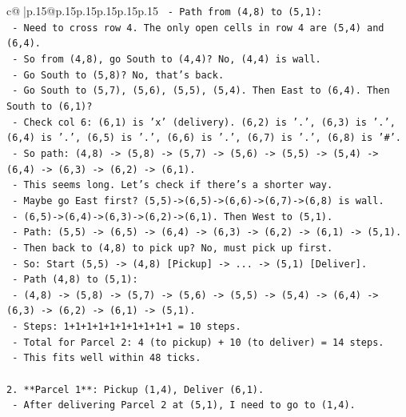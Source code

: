 \documentclass{article}
\begin{document}
{\begin{supertabular}{c@{$\;$}|p{.15\linewidth}@{}p{.15\linewidth}p{.15\linewidth}p{.15\linewidth}p{.15\linewidth}p{.15\linewidth}}
{{{\texttt{    {-} Path from (4,8) to (5,1):} \\
\texttt{        {-} Need to cross row 4. The only open cells in row 4 are (5,4) and (6,4).} \\
\texttt{        {-} So from (4,8), go South to (4,4)? No, (4,4) is wall.} \\
\texttt{        {-} Go South to (5,8)? No, that's back.} \\
\texttt{        {-} Go South to (5,7), (5,6), (5,5), (5,4). Then East to (6,4). Then South to (6,1)?} \\
\texttt{        {-} Check col 6: (6,1) is 'x' (delivery). (6,2) is '.', (6,3) is '.', (6,4) is '.', (6,5) is '.', (6,6) is '.', (6,7) is '.', (6,8) is '\#'.} \\
\texttt{        {-} So path: (4,8) {-}> (5,8) {-}> (5,7) {-}> (5,6) {-}> (5,5) {-}> (5,4) {-}> (6,4) {-}> (6,3) {-}> (6,2) {-}> (6,1).} \\
\texttt{        {-} This seems long. Let's check if there's a shorter way.} \\
\texttt{        {-} Maybe go East first? (5,5){-}>(6,5){-}>(6,6){-}>(6,7){-}>(6,8) is wall.} \\
\texttt{        {-} (6,5){-}>(6,4){-}>(6,3){-}>(6,2){-}>(6,1). Then West to (5,1).} \\
\texttt{        {-} Path: (5,5) {-}> (6,5) {-}> (6,4) {-}> (6,3) {-}> (6,2) {-}> (6,1) {-}> (5,1).} \\
\texttt{        {-} Then back to (4,8) to pick up? No, must pick up first.} \\
\texttt{        {-} So: Start (5,5) {-}> (4,8) {[}Pickup{]} {-}> ... {-}> (5,1) {[}Deliver{]}.} \\
\texttt{        {-} Path (4,8) to (5,1):} \\
\texttt{          {-} (4,8) {-}> (5,8) {-}> (5,7) {-}> (5,6) {-}> (5,5) {-}> (5,4) {-}> (6,4) {-}> (6,3) {-}> (6,2) {-}> (6,1) {-}> (5,1).} \\
\texttt{          {-} Steps: 1+1+1+1+1+1+1+1+1+1 = 10 steps.} \\
\texttt{          {-} Total for Parcel 2: 4 (to pickup) + 10 (to deliver) = 14 steps.} \\
\texttt{          {-} This fits well within 48 ticks.} \\
\\ 
\texttt{2.  **Parcel 1**: Pickup (1,4), Deliver (6,1).} \\
\texttt{    {-} After delivering Parcel 2 at (5,1), I need to go to (1,4).} \\
}}}
\end{supertabular}}
\end{document}
